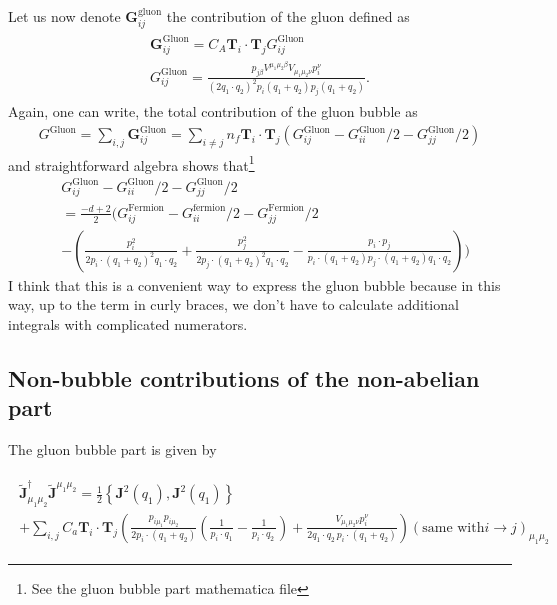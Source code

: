 \documentclass[a4paper,11pt]{article}
\numberwithin{equation}{section}
\newcommand{\bJ}{\mathbf{J}}
\newcommand{\ldot}{\!\cdot\!}
\newcommand{\bd}[1]{\mathbf{#1}}
\begin{document}
Let us now denote $\bd{G}_{ij}^{\text{gluon}}$ the contribution of the gluon defined as 
\begin{align}
\begin{gathered}
\bd{G}^{\text{Gluon}}_{ij} =  C_A  \bd{T}_{i}\cdot  \bd{T}_j  G_{ij}^{\text{Gluon}}\\
 G^{\text{Gluon}}_{ij} =  \frac{p_{j\beta} V^{\mu_1\mu_2\beta}  V_{\mu_1\mu_2\nu}p_i^{\nu} }{(2q_1\cdot q_2)^2p_i(q_1+q_2) p_j(q_1+q_2)}. 
\end{gathered}
\end{align}
Again, one can write, the total contribution of the gluon bubble as 
\begin{align}
G^{\text{Gluon}} = \sum_{i,j}\bd{G}^{\text{Gluon}}_{ij}=  \sum_{i\ne j} n_f \bd{T}_i \cdot \bd{T}_j 
\left ( G^{\text{Gluon}}_{ij}-G^{\text{Gluon}}_{ii}/2-G^{\text{Gluon}}_{jj}/2\right)
\end{align}
and straightforward algebra shows that\footnote{See the gluon bubble part mathematica file}
\begin{align}
& G^{\text{Gluon}}_{ij}-G^{\text{Gluon}}_{ii}/2-G^{\text{Gluon}}_{jj}/2\nonumber \\
&=  \frac{-d+2}{2}  \Bigg( G^{\text{Fermion}}_{ij}-G^{\text{fermion}}_{ii}/2-G^{\text{Fermion}}_{jj}/2 \nonumber \\
&- \left( \frac{p_i^2}{2p_i\ldot(q_1+q_2)^2 q_1\cdot q_2}+  \frac{p_j^2}{2p_j\ldot(q_1+q_2)^2 q_1\cdot q_2}- 
 \frac{p_i\cdot p_j}{p_i\ldot(q_1+q_2) p_j\ldot(q_1+q_2) q_1\cdot q_2}  \right)
\Bigg) 
\end{align}
I think that this is a convenient way to express the gluon bubble because in this way, up to the term in curly braces, we don't have to calculate  additional integrals with complicated numerators. 

\subsection{Non-bubble contributions of the non-abelian part}

The gluon bubble part is given by 

\begin{align}
\begin{gathered}
\widetilde{\bJ}^\dagger_{\mu_1\mu_2}  \widetilde{\bJ}^{\mu_1\mu_2}   
= \frac{1}{2}\left\{ \bd{J}^2(q_1), \bd{J}^2(q_1) \right\} \\
+
\sum_{i,j}
 C_a\bd{T}_i\ldot\bd{T}_j
 \left( \frac{p_{i\mu_1}p_{i\mu_2}}{2p_i \ldot (q_1+q_2)} \left(\frac{1}{p_i\ldot q_1}-\frac{1}{p_i\ldot q_2\, }\right)
+ \frac{V_{\mu_1\mu_2\nu} p_{i}^ \nu}{2q_1\ldot q_2   \, p_i \ldot (q_1+q_2)} \right) (\text{same with} i\rightarrow j)_{\mu_1\mu_2}
\end{gathered}
\end{align}
\end{document}
